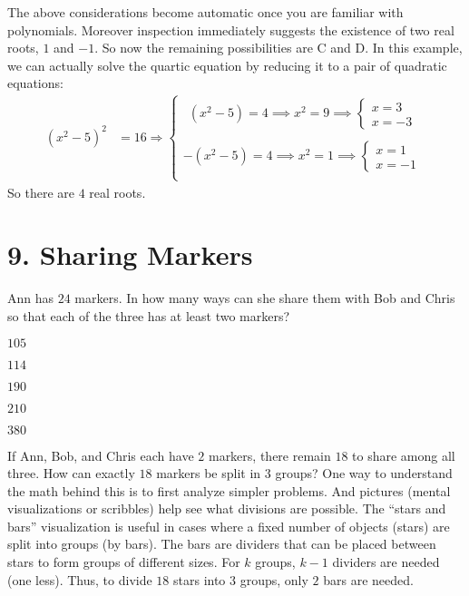 \documentclass[12pt]{article}
\begin{document}
The above considerations become automatic once you are familiar with polynomials. Moreover inspection immediately suggests the existence of two real roots, $1$ and $-1$. So now the remaining possibilities are C and D. 
In this example, we can actually solve the quartic equation by reducing it to a pair of quadratic equations: 
\begin{align*}
(x^2-5)^2 & = 16 
\Longrightarrow
  \begin{cases}
  ~~(x^2-5) = 4 
    \implies x^2 = 9
      \implies 
        \begin{cases}
        x = 3 \\
        x = -3
        \end{cases} \\ \\
  -(x^2-5) = 4 
    \implies x^2 = 1
      \implies 
        \begin{cases}
        x = 1 \\
        x = -1
        \end{cases} \\
  \end{cases} 
\end{align*}
So there are $4$ real roots. 




\newpage
\section*{9. Sharing Markers}
\begin{question}
Ann has $24$ markers. In how many ways can she share them with Bob and Chris so that each of the three has at least two markers?
\begin{enumerate*}
  \item $105$
  \item $114$
  \item $190$
  \item $210$
  \item $380$
\end{enumerate*}
\end{question}

If Ann, Bob, and Chris each have $2$ markers, there remain $18$ to share among all three. How can exactly $18$ markers be split in $3$ groups? One way to understand the math behind this is to first analyze simpler problems. And pictures (mental visualizations or scribbles) help see what divisions are possible. The ``stars and bars'' visualization is useful in cases where a fixed number of objects (stars) are split into groups (by bars). The bars are dividers that can be placed between stars to form groups of different sizes. For $k$ groups, $k-1$ dividers are needed (one less). Thus, to divide $18$ stars into $3$ groups, only $2$ bars are needed.  
\end{document}

